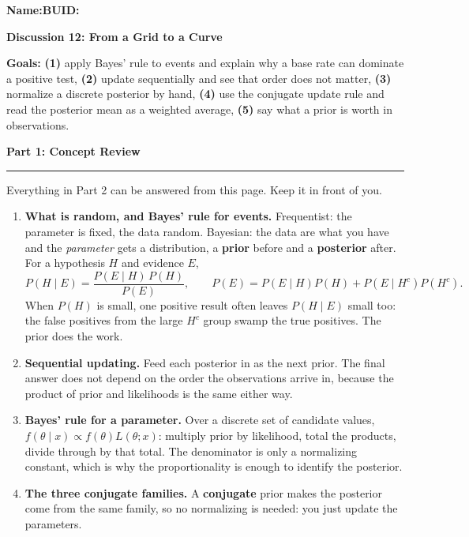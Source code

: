 \documentclass[11pt]{article}
\newcommand{\blankline}[1]{\underline{\hspace{#1}}}
\newcommand{\parttitle}[1]{%
  \par\medskip\noindent
  {\large\bfseries #1}\par
  \vspace{-.5em}\noindent\rule{\linewidth}{0.4pt}\par\smallskip}
\begin{document}
\noindent\textbf{Name:}\blankline{2.3in}\hfill\textbf{BUID:}\blankline{1.6in}

\begin{center}
  {\Large\bfseries Discussion 12: From a Grid to a Curve}
\end{center}

\noindent\textbf{Goals:} \textbf{(1)} apply Bayes' rule to events and explain why a base rate can
dominate a positive test, \textbf{(2)} update sequentially and see that order does not matter,
\textbf{(3)} normalize a discrete posterior by hand, \textbf{(4)} use the conjugate update rule and
read the posterior mean as a weighted average, \textbf{(5)} say what a prior is worth in
observations.

\parttitle{Part 1: Concept Review}

{\small

\noindent Everything in Part 2 can be answered from this page. Keep it in front of you.

\begin{enumerate}[label=\textbf{\arabic*.}, wide=0pt, itemsep=.4em, topsep=.5em]

\item \textbf{What is random, and Bayes' rule for events.} Frequentist: the parameter is fixed, the
data random. Bayesian: the data are what you have and the \emph{parameter} gets a distribution, a
\textbf{prior} before and a \textbf{posterior} after. For a hypothesis $H$ and evidence $E$,
\[
P(H \mid E) = \frac{P(E \mid H)\,P(H)}{P(E)},
\qquad
P(E) = P(E \mid H)P(H) + P(E \mid H^c)P(H^c).
\]
When $P(H)$ is small, one positive result often leaves $P(H\mid E)$ small too: the false positives
from the large $H^c$ group swamp the true positives. The prior does the work.

\item \textbf{Sequential updating.} Feed each posterior in as the next prior. The final answer does
not depend on the order the observations arrive in, because the product of prior and likelihoods is
the same either way.

\item \textbf{Bayes' rule for a parameter.} Over a discrete set of candidate values,
$f(\theta \mid x) \propto f(\theta)L(\theta;x)$: multiply prior by likelihood, total the products,
divide through by that total. The denominator is only a normalizing constant, which is why the
proportionality is enough to identify the posterior.

\item \textbf{The three conjugate families.} A \textbf{conjugate} prior makes the posterior come
from the same family, so no normalizing is needed: you just update the parameters.


\end{enumerate}}
\end{document}
